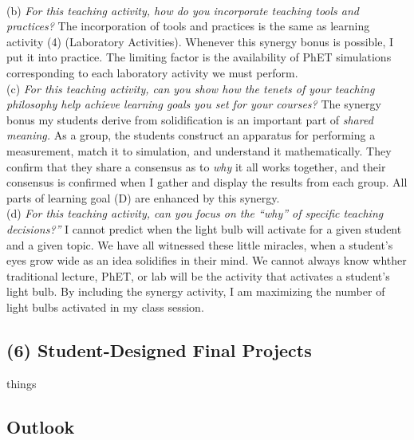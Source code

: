 \documentclass[../../../main.tex]{subfiles}
\begin{document}
\\
\vspace{0.25cm}
(b) \textit{For this teaching activity, how do you incorporate teaching tools and practices?}  The incorporation of tools and practices is the same as learning activity (4) (Laboratory Activities).  Whenever this synergy bonus is possible, I put it into practice.  The limiting factor is the availability of PhET simulations corresponding to each laboratory activity we must perform.
\\
\vspace{0.25cm}
(c) \textit{For this teaching activity, can you show how the tenets of your teaching philosophy help achieve learning goals you
set for your courses?}  The synergy bonus my students derive from solidification is an important part of \textit{shared meaning.}  As a group, the students construct an apparatus for performing a measurement, match it to simulation, and understand it mathematically.  They confirm that they share a consensus as to \textit{why} it all works together, and their consensus is confirmed when I gather and display the results from each group.  All parts of learning goal (D) are enhanced by this synergy.
\\
\vspace{0.25cm}
(d) \textit{For this teaching activity, can you focus on the ``why'' of specific teaching decisions?''} I cannot predict when the light bulb will activate for a given student and a given topic.  We have all witnessed these little miracles, when a student's eyes grow wide as an idea solidifies in their mind.  We cannot always know whther traditional lecture, PhET, or lab will be the activity that activates a student's light bulb.  By including the synergy activity, I am maximizing the number of light bulbs activated in my class session.

\subsection{(6) Student-Designed Final Projects}
things
\subsection{Outlook}

\end{document}
